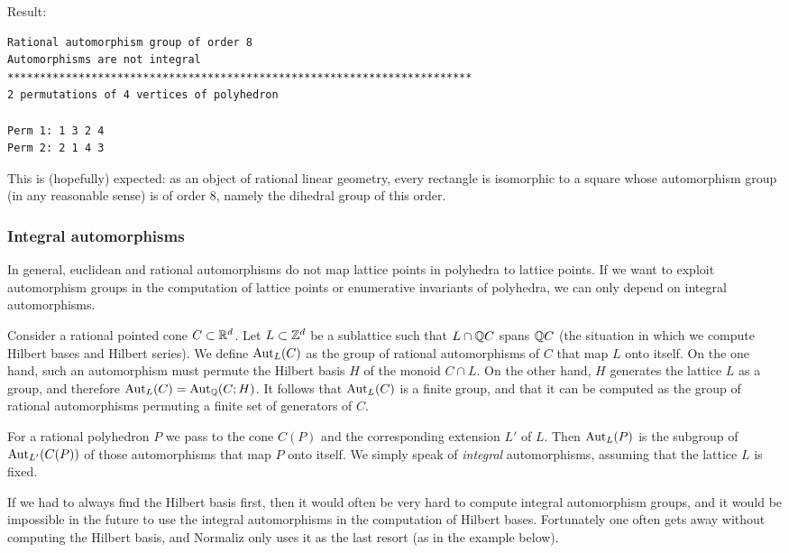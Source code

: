 Result:
\begin{Verbatim}
Rational automorphism group of order 8
Automorphisms are not integral
************************************************************************
2 permutations of 4 vertices of polyhedron

Perm 1: 1 3 2 4
Perm 2: 2 1 4 3
\end{Verbatim}
This is (hopefully) expected: as an object of rational linear geometry, every rectangle is isomorphic to a square whose automorphism group (in any reasonable sense) is of order $8$, namely the dihedral group of this order.

\subsubsection{Integral automorphisms}

In general, euclidean and rational automorphisms do not map lattice points in polyhedra to lattice points. If we want to exploit automorphism groups in the computation of lattice points or enumerative invariants of polyhedra, we can only depend on integral automorphisms.

Consider a rational pointed cone $C\subset{\mathbb R}^d$. Let $L\subset{\mathbb Z}^d$ be a sublattice such that $L\cap {\mathbb Q} C$ spans ${\mathbb Q} C$ (the situation in which we compute Hilbert bases and Hilbert series). We define $\operatorname{Aut}_L(C)$ as the group of rational automorphisms of $C$ that map $L$ onto itself. On the one hand, such an automorphism must permute the Hilbert basis $H$ of the monoid $C\cap L$. On the other hand, $H$ generates the lattice $L$ as a group, and therefore $\operatorname{Aut}_L(C)=\operatorname{Aut}_{\mathbb Q}(C;H)$. It follows that $\operatorname{Aut}_L(C)$ is a finite group, and that it can be computed as the group of rational automorphisms permuting a finite set of generators of $C$.

For a rational polyhedron $P$ we pass to the cone $C(P)$ and the corresponding extension $L'$ of $L$. Then $\operatorname{Aut}_L(P)$ is the subgroup of $\operatorname{Aut}_{L'}(C(P))$ of those automorphisms that map $P$ onto itself. We simply speak of \emph{integral} automorphisms, assuming that the lattice $L$ is fixed.

If we had to always find the Hilbert basis first, then it would often be very hard to compute integral automorphism groups, and it would be impossible in the future to use the integral automorphisms in the computation of Hilbert bases. Fortunately one often gets away without computing the Hilbert basis, and Normaliz only uses it as the last resort (as in the example below).

